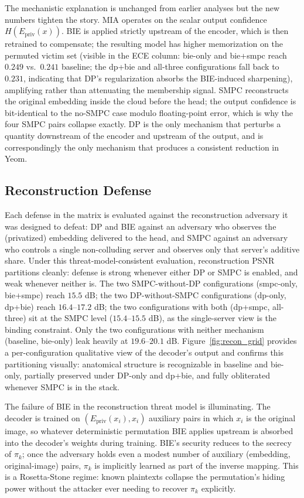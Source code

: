 \documentclass[conference]{IEEEtran}
\begin{document}
The mechanistic explanation is unchanged from earlier analyses but the new numbers tighten the story. MIA operates on the scalar output confidence $H(E_{\mathrm{priv}}(x))$. BIE is applied strictly upstream of the encoder, which is then retrained to compensate; the resulting model has  {higher} memorization on the permuted victim set (visible in the ECE column: bie-only and bie+smpc reach $0.249$ vs.~$0.241$ baseline; the dp+bie and all-three configurations fall back to $0.231$, indicating that DP's regularization absorbs the BIE-induced sharpening), amplifying rather than attenuating the membership signal. SMPC reconstructs the original embedding inside the cloud before the head; the output confidence is bit-identical to the no-SMPC case modulo floating-point error, which is why the four SMPC pairs collapse exactly. DP is the only mechanism that perturbs a quantity downstream of the encoder and upstream of the output, and is correspondingly the only mechanism that produces a consistent reduction in Yeom.

\subsection{Reconstruction Defense}
Each defense in the matrix is evaluated against the reconstruction adversary it was  {designed} to defeat: DP and BIE against an adversary who observes the (privatized) embedding delivered to the head, and SMPC against an adversary who controls a single non-colluding server and observes only that server's additive share. Under this threat-model-consistent evaluation, reconstruction PSNR partitions cleanly: defense is strong whenever  {either} DP or SMPC is enabled, and weak whenever neither is. The two SMPC-without-DP configurations (smpc-only, bie+smpc) reach $15.5$ dB; the two DP-without-SMPC configurations (dp-only, dp+bie) reach $16.4$--$17.2$ dB; the two configurations with both (dp+smpc, all-three) sit at the SMPC level ($15.4$--$15.5$ dB), as the single-server view is the binding constraint. Only the two configurations with neither mechanism (baseline, bie-only) leak heavily at $19.6$--$20.1$ dB. Figure~\ref{fig:recon_grid} provides a per-configuration qualitative view of the decoder's output and confirms this partitioning visually: anatomical structure is recognizable in baseline and bie-only, partially preserved under DP-only and dp+bie, and fully obliterated whenever SMPC is in the stack.

The failure of BIE in the reconstruction threat model is illuminating. The decoder is trained on $(E_{\mathrm{priv}}(x_i), x_i)$ auxiliary pairs in which $x_i$ is the  {original} image, so whatever deterministic permutation BIE applies upstream is absorbed into the decoder's weights during training. BIE's security reduces to the secrecy of $\pi_k$; once the adversary holds even a modest number of auxiliary (embedding, original-image) pairs, $\pi_k$ is  {implicitly learned} as part of the inverse mapping. This is a Rosetta-Stone regime: known plaintexts collapse the permutation's hiding power without the attacker ever needing to recover $\pi_k$ explicitly.
\end{document}
